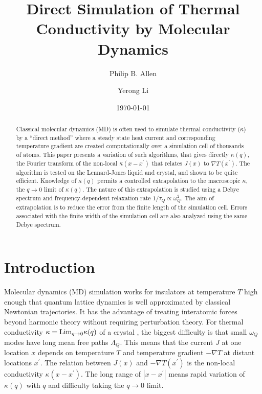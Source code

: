 \documentclass[aps,prb,twocolumn,showpacs,superscriptaddress]{revtex4-1}\begin{tiny}\end{tiny}
\begin{document}
\title{Direct Simulation of Thermal Conductivity by Molecular Dynamics}

\author{Philip B. Allen}
\author{Yerong Li}
\date{\today}


\begin{abstract}
Classical molecular dynamics (MD) is often used to simulate thermal conductivity ($\kappa$) by a
``direct method'' where a steady state heat current and corresponding temperature gradient are 
created computationally over a simulation cell of thousands of atoms.  
This paper presents a variation of such algorithms, that gives directly $\kappa(q)$,
the Fourier transform of the non-local $\kappa(x-x^\prime)$ that relates $J(x)$ to $\nabla T(x^\prime)$.
The algorithm is tested on the Lennard-Jones liquid and crystal, and shown to be quite efficient.
Knowledge of $\kappa(q)$
permits a controlled extrapolation to the macroscopic $\kappa$, the $q \rightarrow 0$ limit of
$\kappa(q)$.  The nature of this extrapolation is studied using a Debye spectrum and frequency-dependent
relaxation rate $1/\tau_Q \propto \omega_Q^2$.  The aim of
extrapolation is to reduce the error from the finite length of the simulation cell.
Errors associated with the finite width of the simulation cell are also analyzed using the same Debye spectrum. 
\end{abstract}

\maketitle


\section{Introduction}

Molecular dynamics (MD) simulation works for insulators at temperature $T$
high enough that quantum lattice dynamics 
is well approximated by classical Newtonian trajectories.  It has the advantage of
treating interatomic forces beyond harmonic theory without requiring perturbation theory.
For thermal conductivity \cite{Visscher,Schelling} 
$\kappa={\rm Lim}_{q\rightarrow0}\kappa(q)$ of a crystal \cite{Allen}, 
the biggest difficulty is that small $\omega_Q$ modes have long mean free paths $\Lambda_Q$.
This means that the current $J$ at one location $x$ depends on temperature $T$ and
temperature gradient $-\nabla T$ at distant locations $x^\prime$.  The relation between
$J(x)$ and $-\nabla T(x^\prime)$ is the non-local conductivity $\kappa(x-x^\prime)$.  The
long range of $|x-x^\prime|$ means rapid variation of $\kappa(q)$ with $q$ and difficulty
taking the $q\rightarrow 0$ limit.  
\end{document}
